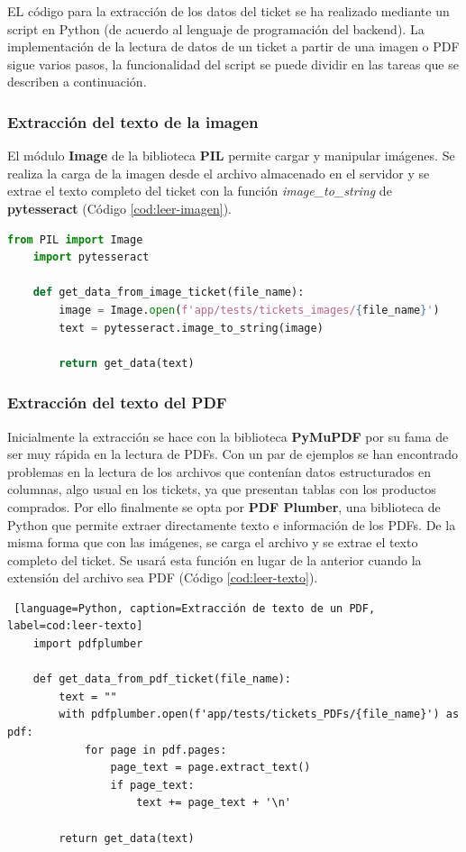 EL código para la extracción de los datos del ticket se ha realizado mediante un script en Python (de acuerdo al lenguaje de programación del backend). La implementación de la lectura de datos de un ticket a partir de una imagen o PDF sigue varios pasos, la funcionalidad del script se puede dividir en las tareas que se describen a continuación.


\subsubsection{Extracción del texto de la imagen}
El módulo \textbf{Image} de la biblioteca \textbf{PIL} permite cargar y manipular imágenes. Se realiza la carga de la imagen desde el archivo almacenado en el servidor y se extrae el texto completo del ticket con la función \textit{image\_to\_string} de \textbf{pytesseract} (Código \ref{cod:leer-imagen}).
    
\begin{lstlisting}[language=Python, caption=Extracción de texto de una imagen, label=cod:leer-imagen]
    from PIL import Image
    import pytesseract

    def get_data_from_image_ticket(file_name):
        image = Image.open(f'app/tests/tickets_images/{file_name}')
        text = pytesseract.image_to_string(image)

        return get_data(text)
\end{lstlisting}

\subsubsection{Extracción del texto del PDF}
Inicialmente la extracción se hace con la biblioteca \textbf{PyMuPDF} por su fama de ser muy rápida en la lectura de PDFs. Con un par de ejemplos se han encontrado problemas en la lectura de los archivos que contenían datos estructurados en columnas, algo usual en los tickets, ya que presentan tablas con los productos comprados. Por ello finalmente se opta por \textbf{PDF Plumber}, una biblioteca de Python que permite extraer directamente texto e información de los PDFs. De la misma forma que con las imágenes, se carga el archivo y se extrae el texto completo del ticket. Se usará esta función en lugar de la anterior cuando la extensión del archivo sea PDF (Código \ref{cod:leer-texto}).

\begin{lstlisting} [language=Python, caption=Extracción de texto de un PDF, label=cod:leer-texto]
    import pdfplumber

    def get_data_from_pdf_ticket(file_name):
        text = ""
        with pdfplumber.open(f'app/tests/tickets_PDFs/{file_name}') as pdf:
            for page in pdf.pages:
                page_text = page.extract_text()
                if page_text:
                    text += page_text + '\n'
        
        return get_data(text)
\end{lstlisting}

